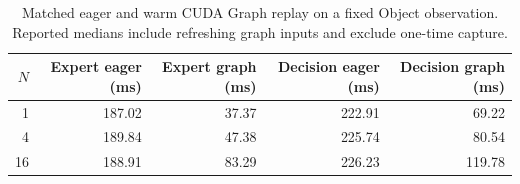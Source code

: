 \begin{table}[tb]
\centering\small
\caption{Matched eager and warm CUDA Graph replay on a fixed Object observation. Reported medians include refreshing graph inputs and exclude one-time capture.}
\label{tab:graph}
\begin{tabular}{@{}rrrrr@{}}
\toprule
$N$ & Expert eager (ms) & Expert graph (ms) & Decision eager (ms) & Decision graph (ms) \\
\midrule
1 & 187.02 & 37.37 & 222.91 & 69.22 \\
4 & 189.84 & 47.38 & 225.74 & 80.54 \\
16 & 188.91 & 83.29 & 226.23 & 119.78 \\
\bottomrule
\end{tabular}
\end{table}
